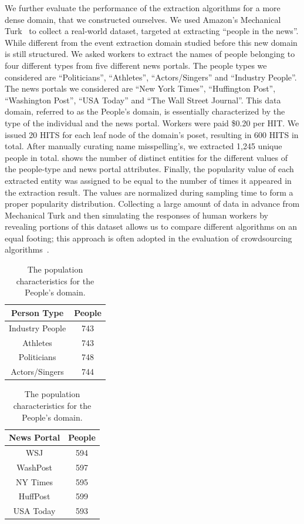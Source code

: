 We further evaluate the performance of the extraction algorithms for a more dense domain, that we constructed ourselves. We used Amazon's Mechanical Turk~\cite{mturk} to collect a real-world dataset, targeted at extracting ``people in the news''. While different from the event extraction domain studied before this new domain is still structured. We asked workers to extract the names of people belonging to four different types from five different news portals. The people types we considered are ``Politicians'', ``Athletes'', ``Actors/Singers'' and ``Industry People''. The news portals we considered are ``New York Times'', ``Huffington Post'', ``Washington Post'', ``USA  Today'' and ``The Wall Street Journal''. This data domain, referred to as the People's domain, is essentially characterized by the type of the individual and the news portal. Workers were paid \$0.20 per HIT. We issued 20 HITS for each leaf node of the domain's poset, resulting in 600 HITS in total. After manually curating name misspelling's, we extracted 1,245 unique people in total.  shows the number of distinct entities for the different values of the people-type and news portal attributes. Finally, the popularity value of each extracted entity was assigned to be equal to the number of times it appeared in the extraction result. The values are normalized during sampling time to form a proper popularity distribution. Collecting a large amount of data in advance from Mechanical Turk and then simulating the responses of human workers by revealing portions of this dataset allows us to compare different algorithms on an equal footing; this approach is often adopted in the evaluation of crowdsourcing algorithms~\cite{DBLP:journals/pvldb/ParameswaranBG0PW14, marcus:2011,trushkowsky:2013}.

\begin{table}
\scriptsize\center
\caption{The population characteristics for the People's domain.}
\label{tab:ptypedata}
\begin{tabular}{|c|c|}
\hline
\textbf{Person Type} & \textbf{People} \\ \hline
Industry People & 743 \\
Athletes & 743 \\
Politicians & 748 \\
Actors/Singers & 744 \\ \hline
\end{tabular}
\quad
\begin{tabular}{|c|c|}
\hline
\textbf{News Portal} & \textbf{People} \\ \hline
WSJ & 594 \\
WashPost & 597 \\
NY Times & 595 \\
HuffPost & 599 \\
USA Today & 593 \\ \hline
\end{tabular}
\vspace{-15pt}
\end{table}

